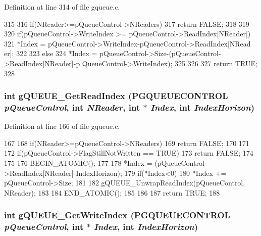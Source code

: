 Definition at line 314 of file gqueue.c.


\begin{DoxyCode}
315 {
316         if(NReader>=pQueueControl->NReaders){
317                 return FALSE;
318         }
319 
320         if(pQueueControl->WriteIndex >= pQueueControl->ReadIndex[NReader]){
321                 *Index = pQueueControl->WriteIndex-pQueueControl->ReadIndex[NRead
      er];
322         }
323         else{
324                 *Index = pQueueControl->Size-(pQueueControl->ReadIndex[NReader]-p
      QueueControl->WriteIndex);
325         }
326         
327         return TRUE;
328 }                      
\end{DoxyCode}
\subsubsection[{gQUEUE\_\-GetReadIndex}]{\setlength{\rightskip}{0pt plus 5cm}int gQUEUE\_\-GetReadIndex ({\bf PGQUEUECONTROL} {\em pQueueControl}, \/  int {\em NReader}, \/  int $\ast$ {\em Index}, \/  int {\em IndexHorizon})}\label{gqueue_8h_a273e65bb0fa92f17904f052a4def072d}


Definition at line 166 of file gqueue.c.


\begin{DoxyCode}
167 {
168         if(NReader>=pQueueControl->NReaders){
169                 return FALSE;
170         }
171 
172         if(pQueueControl->FlagStillNotWritten == TRUE){
173                 return FALSE;
174         }
175     
176 BEGIN_ATOMIC();
177 
178         *Index = (pQueueControl->ReadIndex[NReader]-IndexHorizon);
179         if(*Index<0){
180                 *Index += pQueueControl->Size;
181         }
182         gQUEUE_UnwrapReadIndex(pQueueControl, NReader);
183 
184 END_ATOMIC();
185 
186 
187     return TRUE;
188 }                      
\end{DoxyCode}
\subsubsection[{gQUEUE\_\-GetWriteIndex}]{\setlength{\rightskip}{0pt plus 5cm}int gQUEUE\_\-GetWriteIndex ({\bf PGQUEUECONTROL} {\em pQueueControl}, \/  int $\ast$ {\em Index}, \/  int {\em IndexHorizon})}\label{gqueue_8h_ae52e32b31c201f0ffc5134e30a4056ba}


